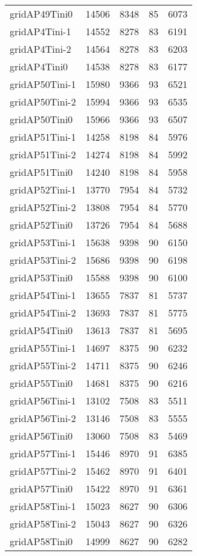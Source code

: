 \begin{longtable}{lrrrr}
gridAP49Tini0 & 14506 & 8348 & 85 & 6073 \\
gridAP4Tini-1 & 14552 & 8278 & 83 & 6191 \\
gridAP4Tini-2 & 14564 & 8278 & 83 & 6203 \\
gridAP4Tini0 & 14538 & 8278 & 83 & 6177 \\
gridAP50Tini-1 & 15980 & 9366 & 93 & 6521 \\
gridAP50Tini-2 & 15994 & 9366 & 93 & 6535 \\
gridAP50Tini0 & 15966 & 9366 & 93 & 6507 \\
gridAP51Tini-1 & 14258 & 8198 & 84 & 5976 \\
gridAP51Tini-2 & 14274 & 8198 & 84 & 5992 \\
gridAP51Tini0 & 14240 & 8198 & 84 & 5958 \\
gridAP52Tini-1 & 13770 & 7954 & 84 & 5732 \\
gridAP52Tini-2 & 13808 & 7954 & 84 & 5770 \\
gridAP52Tini0 & 13726 & 7954 & 84 & 5688 \\
gridAP53Tini-1 & 15638 & 9398 & 90 & 6150 \\
gridAP53Tini-2 & 15686 & 9398 & 90 & 6198 \\
gridAP53Tini0 & 15588 & 9398 & 90 & 6100 \\
gridAP54Tini-1 & 13655 & 7837 & 81 & 5737 \\
gridAP54Tini-2 & 13693 & 7837 & 81 & 5775 \\
gridAP54Tini0 & 13613 & 7837 & 81 & 5695 \\
gridAP55Tini-1 & 14697 & 8375 & 90 & 6232 \\
gridAP55Tini-2 & 14711 & 8375 & 90 & 6246 \\
gridAP55Tini0 & 14681 & 8375 & 90 & 6216 \\
gridAP56Tini-1 & 13102 & 7508 & 83 & 5511 \\
gridAP56Tini-2 & 13146 & 7508 & 83 & 5555 \\
gridAP56Tini0 & 13060 & 7508 & 83 & 5469 \\
gridAP57Tini-1 & 15446 & 8970 & 91 & 6385 \\
gridAP57Tini-2 & 15462 & 8970 & 91 & 6401 \\
gridAP57Tini0 & 15422 & 8970 & 91 & 6361 \\
gridAP58Tini-1 & 15023 & 8627 & 90 & 6306 \\
gridAP58Tini-2 & 15043 & 8627 & 90 & 6326 \\
gridAP58Tini0 & 14999 & 8627 & 90 & 6282 \\

\end{longtable}
